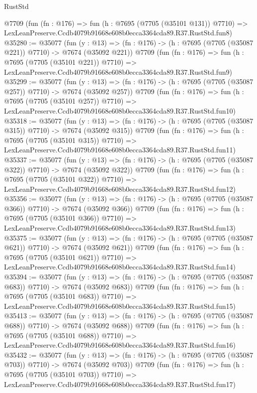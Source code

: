 \begin{lexlean}{RustStd}
\begin{coremodule}
    @7709
    (fun (fn : @176) =>
    fun (h : @7695 (@7705 (@35101 @131)) @7710) =>
    LexLeanPreserve.Ccdb4079b91668e608b0ecca3364cda89.R37.RustStd.fun8)
@35280 := @35077
    (fun (y : @13) => (fn : @176) -> (h : @7695 (@7705 (@35087 @221)) @7710) -> @7674 (@35092 @221))
    @7709
    (fun (fn : @176) =>
    fun (h : @7695 (@7705 (@35101 @221)) @7710) =>
    LexLeanPreserve.Ccdb4079b91668e608b0ecca3364cda89.R37.RustStd.fun9)
@35299 := @35077
    (fun (y : @13) => (fn : @176) -> (h : @7695 (@7705 (@35087 @257)) @7710) -> @7674 (@35092 @257))
    @7709
    (fun (fn : @176) =>
    fun (h : @7695 (@7705 (@35101 @257)) @7710) =>
    LexLeanPreserve.Ccdb4079b91668e608b0ecca3364cda89.R37.RustStd.fun10)
@35318 := @35077
    (fun (y : @13) => (fn : @176) -> (h : @7695 (@7705 (@35087 @315)) @7710) -> @7674 (@35092 @315))
    @7709
    (fun (fn : @176) =>
    fun (h : @7695 (@7705 (@35101 @315)) @7710) =>
    LexLeanPreserve.Ccdb4079b91668e608b0ecca3364cda89.R37.RustStd.fun11)
@35337 := @35077
    (fun (y : @13) => (fn : @176) -> (h : @7695 (@7705 (@35087 @322)) @7710) -> @7674 (@35092 @322))
    @7709
    (fun (fn : @176) =>
    fun (h : @7695 (@7705 (@35101 @322)) @7710) =>
    LexLeanPreserve.Ccdb4079b91668e608b0ecca3364cda89.R37.RustStd.fun12)
@35356 := @35077
    (fun (y : @13) => (fn : @176) -> (h : @7695 (@7705 (@35087 @366)) @7710) -> @7674 (@35092 @366))
    @7709
    (fun (fn : @176) =>
    fun (h : @7695 (@7705 (@35101 @366)) @7710) =>
    LexLeanPreserve.Ccdb4079b91668e608b0ecca3364cda89.R37.RustStd.fun13)
@35375 := @35077
    (fun (y : @13) => (fn : @176) -> (h : @7695 (@7705 (@35087 @621)) @7710) -> @7674 (@35092 @621))
    @7709
    (fun (fn : @176) =>
    fun (h : @7695 (@7705 (@35101 @621)) @7710) =>
    LexLeanPreserve.Ccdb4079b91668e608b0ecca3364cda89.R37.RustStd.fun14)
@35394 := @35077
    (fun (y : @13) => (fn : @176) -> (h : @7695 (@7705 (@35087 @683)) @7710) -> @7674 (@35092 @683))
    @7709
    (fun (fn : @176) =>
    fun (h : @7695 (@7705 (@35101 @683)) @7710) =>
    LexLeanPreserve.Ccdb4079b91668e608b0ecca3364cda89.R37.RustStd.fun15)
@35413 := @35077
    (fun (y : @13) => (fn : @176) -> (h : @7695 (@7705 (@35087 @688)) @7710) -> @7674 (@35092 @688))
    @7709
    (fun (fn : @176) =>
    fun (h : @7695 (@7705 (@35101 @688)) @7710) =>
    LexLeanPreserve.Ccdb4079b91668e608b0ecca3364cda89.R37.RustStd.fun16)
@35432 := @35077
    (fun (y : @13) => (fn : @176) -> (h : @7695 (@7705 (@35087 @703)) @7710) -> @7674 (@35092 @703))
    @7709
    (fun (fn : @176) =>
    fun (h : @7695 (@7705 (@35101 @703)) @7710) =>
    LexLeanPreserve.Ccdb4079b91668e608b0ecca3364cda89.R37.RustStd.fun17)

\end{coremodule}
\end{lexlean}
